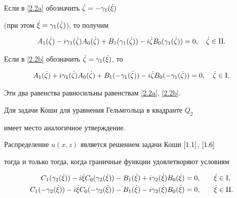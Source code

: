 Если в \eqref{2.2a} обозначить $\Dot{\zeta}=-\gamma_1(\Dot{\xi})$


(при этом $\Dot{\xi}=\gamma_1(\Dot{\zeta})$), то получим


\begin{equation}\label{2.5a}


A_1(\ddz)-i\ga_1(\ddz) A_0(\ddz)


+B_1(\ga_1(\ddz))-i\ddz B_0(\ga_1(\ddz)) = 0,\quad


\ddz\in \mathrm{II} .


\end{equation}


Если в \eqref{2.2b} обозначить $\Dot{\zeta}=\gamma_1(\Dot{\xi})$, то


\begin{equation}\label{2.5b}


A_1(\ddz)+i\ga_1(\ddz) A_0(\ddz)


+B_1(-\ga_1(\ddz))-i\ddz B_0(-\ga_1(\ddz)) = 0,\quad


\ddz\in \mathrm I .


\end{equation}


Эти два равенства равносильны равенствам \eqref{2.2a}, \eqref{2.2b}.





Для задачи Коши для уравнения Гельмгольца в квадранте $Q_2$


имеет место аналогичное утверждение.







Распределение $u(x,z)$ является решением задачи Коши $\eqref{1.1}$, $\eqref{1.6}$


тогда и только тогда, когда граничные функции удовлетворяют условиям


\begin{alignat}{2}


\label{2.7a}


C_1(\ga_2(\dxi))-i\dxi C_0(\ga_2(\dxi))


-B_1(\dxi)+i\ga_2(\dxi)B_0(\dxi)&=0,&\quad \dxi&\in \mathrm I, \\


%


\label{2.7b}


C_1(-\ga_2(\dxi))-i\dxi C_0(-\ga_2(\dxi))


 -B_1(\dxi)-i\ga_2(\dxi)B_0(\dxi)&=0,&\quad \dxi&\in \mathrm{II} .


\end{alignat}


